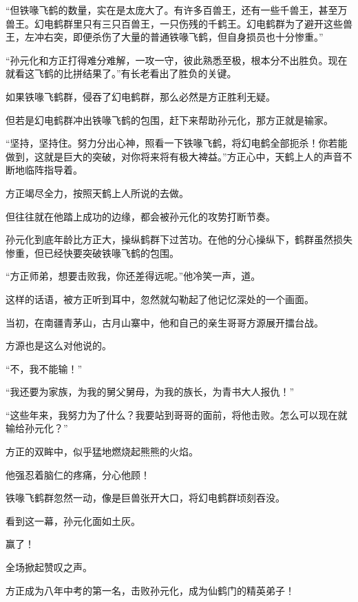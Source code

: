 \begin{this_body}
“但铁喙飞鹤的数量，实在是太庞大了。有许多百兽王，还有一些千兽王，甚至万兽王。幻电鹤群里只有三只百兽王，一只伤残的千鹤王。幻电鹤群为了避开这些兽王，左冲右突，即便杀伤了大量的普通铁喙飞鹤，但自身损员也十分惨重。”

“孙元化和方正打得难分难解，一攻一守，彼此熟悉至极，根本分不出胜负。现在就看这飞鹤的比拼结果了。”有长老看出了胜负的关键。

如果铁喙飞鹤群，侵吞了幻电鹤群，那么必然是方正胜利无疑。

但若是幻电鹤群冲出铁喙飞鹤的包围，赶下来帮助孙元化，那方正就是输家。

“坚持，坚持住。努力分出心神，照看一下铁喙飞鹤，将幻电鹤全部扼杀！你若能做到，这就是巨大的突破，对你将来将有极大裨益。”方正心中，天鹤上人的声音不断地临阵指导着。

方正竭尽全力，按照天鹤上人所说的去做。

但往往就在他踏上成功的边缘，都会被孙元化的攻势打断节奏。

孙元化到底年龄比方正大，操纵鹤群下过苦功。在他的分心操纵下，鹤群虽然损失惨重，但已经快要突破铁喙飞鹤的包围。

“方正师弟，想要击败我，你还差得远呢。”他冷笑一声，道。

这样的话语，被方正听到耳中，忽然就勾勒起了他记忆深处的一个画面。

当初，在南疆青茅山，古月山寨中，他和自己的亲生哥哥方源展开擂台战。

方源也是这么对他说的。

“不，我不能输！”

“我还要为家族，为我的舅父舅母，为我的族长，为青书大人报仇！”

“这些年来，我努力为了什么？我要站到哥哥的面前，将他击败。怎么可以现在就输给孙元化？”

方正的双眸中，似乎猛地燃烧起熊熊的火焰。

他强忍着脑仁的疼痛，分心他顾！

铁喙飞鹤群忽然一动，像是巨兽张开大口，将幻电鹤群顷刻吞没。

看到这一幕，孙元化面如土灰。

赢了！

全场掀起赞叹之声。

方正成为八年中考的第一名，击败孙元化，成为仙鹤门的精英弟子！

\end{this_body}

